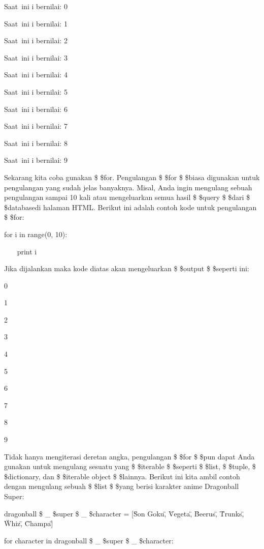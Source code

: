 \vspace{12pt}
Saat~ini i bernilai:  0 \par
Saat~ini i bernilai:  1 \par
Saat~ini i bernilai:  2 \par
Saat~ini i bernilai:  3 \par
Saat~ini i bernilai:  4 \par
Saat~ini i bernilai:  5 \par
Saat~ini i bernilai:  6 \par
Saat~ini i bernilai:  7 \par
Saat~ini i bernilai:  8 \par
Saat~ini i bernilai:  9 \par
\vspace{12pt}
Sekarang kita coba gunakan \$  \$for. Pengulangan \$  \$for \$  \$biasa digunakan untuk pengulangan yang sudah jelas banyaknya. Misal, Anda ingin mengulang sebuah pengulangan sampai 10 kali atau mengeluarkan semua hasil \$  \$query \$  \$dari \$  \$databasedi halaman HTML. Berikut ini adalah contoh kode untuk pengulangan \$  \$for: \par
for i in range(0, 10): \par
~~~ print i \par
Jika dijalankan maka kode diatas akan mengeluarkan \$  \$output \$  \$seperti ini: \par
\vspace{12pt}
0 \par
1 \par
2 \par
3 \par
4 \par
5 \par
6 \par
7 \par
8 \par
9 \par
Tidak hanya mengiterasi deretan angka, pengulangan \$  \$for \$  \$pun dapat Anda gunakan untuk mengulang sesuatu yang \$  \$iterable \$  \$seperti \$  \$list, \$  \$tuple, \$  \$dictionary, dan \$  \$iterable object \$  \$lainnya. Berikut ini kita ambil contoh dengan mengulang sebuah \$  \$list \$  \$yang berisi karakter anime Dragonball Super: \par
\vspace{12pt}
dragonball \$  \_  \$super \$  \_  \$character = [\"Son Goku\", \"Vegeta\", \"Beerus\", \"Trunks\", \"Whiz\", \"Champa\"] \par
for character in dragonball \$  \_  \$super \$  \_  \$character: \par
